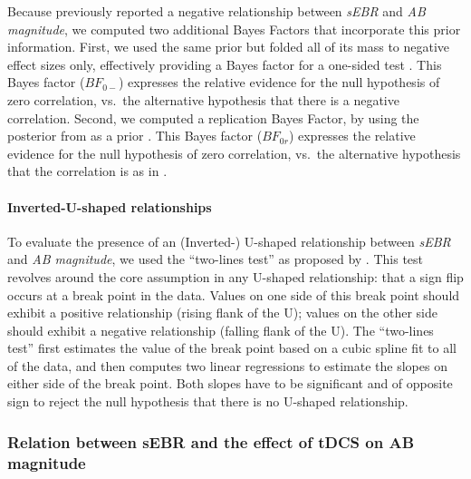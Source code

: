 \documentclass[11pt,]{memoir}
\let\oldparagraph\paragraph
\renewcommand{\paragraph}[1]{\oldparagraph{#1}\mbox{}}
\begin{document}
Because \textcite{Colzato2008} previously reported a negative relationship between \emph{sEBR} and \emph{AB magnitude}, we computed two additional Bayes Factors that incorporate this prior information. First, we used the same prior but folded all of its mass to negative effect sizes only, effectively providing a Bayes factor for a one-sided test \autocite{Wagenmakers2016}. This Bayes factor (\(BF_{0-}\)) expresses the relative evidence for the null hypothesis of zero correlation, vs.~the alternative hypothesis that there is a negative correlation. Second, we computed a replication Bayes Factor, by using the posterior from \textcite{Colzato2008} as a prior \autocites{Verhagen2014}{Wagenmakers2016}. This Bayes factor (\(BF_{0r}\)) expresses the relative evidence for the null hypothesis of zero correlation, vs.~the alternative hypothesis that the correlation is as in \textcite{Colzato2008}.

\hypertarget{inverted-u-shaped-relationships}{%
\paragraph{Inverted-U-shaped relationships}\label{inverted-u-shaped-relationships}}

To evaluate the presence of an (Inverted-) U-shaped relationship between \emph{sEBR} and \emph{AB magnitude}, we used the ``two-lines test'' as proposed by \textcite{Simonsohn2018}. This test revolves around the core assumption in any U-shaped relationship: that a sign flip occurs at a break point in the data. Values on one side of this break point should exhibit a positive relationship (rising flank of the U); values on the other side should exhibit a negative relationship (falling flank of the U). The ``two-lines test'' first estimates the value of the break point based on a cubic spline fit to all of the data, and then computes two linear regressions to estimate the slopes on either side of the break point. Both slopes have to be significant and of opposite sign to reject the null hypothesis that there is no U-shaped relationship.

\hypertarget{relation-between-sebr-and-the-effect-of-tdcs-on-ab-magnitude}{%
\subsubsection{Relation between sEBR and the effect of tDCS on AB magnitude}\label{relation-between-sebr-and-the-effect-of-tdcs-on-ab-magnitude}}
\end{document}
